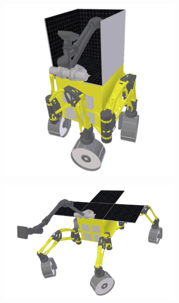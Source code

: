 \begin{figure}[h]
\captionsetup[subfigure]{justification=centering}
\vspace{-2ex}
	\centering
    \setlength{\subfigureWidth}{0.50\textwidth}
    \setlength{\graphicsHeight}{53mm}
    \hypersetup{hidelinks=true}%
    \begin{subfigure}[t]{\subfigureWidth}
        \centering
        \includegraphics[height=\graphicsHeight]{sections/power-system-design/solar-array/images/iani-chaos-stowed.png}
		\label{fig:sub:solar-array-on-rover-for-iani-chaos-stowed}
    \end{subfigure}\hfill%
    \begin{subfigure}[t]{\subfigureWidth}
        \centering
        \includegraphics[height=\graphicsHeight]{sections/power-system-design/solar-array/images/iani-chaos-10deg-pitch.png}

\end{subfigure}
\end{figure}
